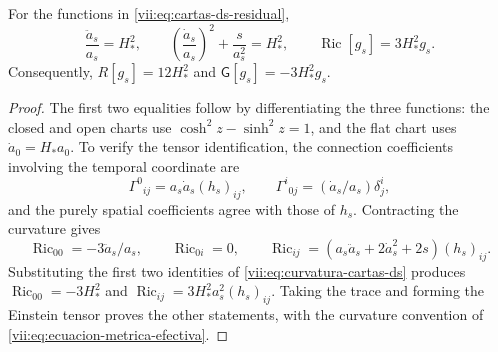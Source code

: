 \begin{lemma}
\label{vii:lem:curvatura-cartas-ds}
For the functions in \eqref{vii:eq:cartas-ds-residual},
\begin{equation}
 \frac{\ddot a_s}{a_s}=H_*^2,\qquad
 \left(\frac{\dot a_s}{a_s}\right)^2+\frac{s}{a_s^2}=H_*^2,
 \qquad
 \operatorname{Ric}[g_s]=3H_*^2g_s.
 \label{vii:eq:curvatura-cartas-ds}
\end{equation}
Consequently, \(R[g_s]=12H_*^2\) and
\(\mathsf G[g_s]=-3H_*^2g_s\).
\end{lemma}
\begin{proof}
The first two equalities follow by differentiating the three functions:
the closed and open charts use
\(\cosh^2z-\sinh^2z=1\), and the flat chart uses
\(\dot a_0=H_*a_0\). To verify the tensor identification,
the connection coefficients involving the temporal coordinate are
\[
 \Gamma^0{}_{ij}=a_s\dot a_s(h_s)_{ij},\qquad
 \Gamma^i{}_{0j}=(\dot a_s/a_s)\delta^i_j,
\]
and the purely spatial coefficients agree with those of \(h_s\).
Contracting the curvature gives
\[
 \operatorname{Ric}_{00}=-3\ddot a_s/a_s,\qquad
 \operatorname{Ric}_{0i}=0,\qquad
 \operatorname{Ric}_{ij}
  =(a_s\ddot a_s+2\dot a_s^2+2s)(h_s)_{ij}.
\]
Substituting the first two identities of
\eqref{vii:eq:curvatura-cartas-ds} produces
\(\operatorname{Ric}_{00}=-3H_*^2\) and
\(\operatorname{Ric}_{ij}=3H_*^2a_s^2(h_s)_{ij}\).
Taking the trace and forming the Einstein tensor proves the other
statements, with the curvature convention of
\eqref{vii:eq:ecuacion-metrica-efectiva}.
\end{proof}

